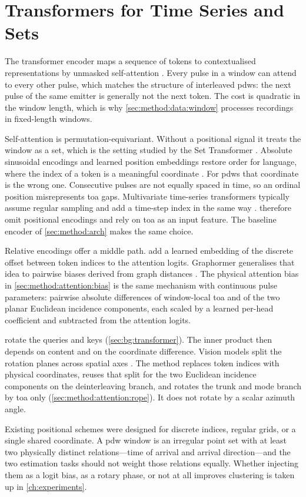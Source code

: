 \section{Transformers for Time Series and Sets}\label{sec:related:transformers_seq}

The transformer encoder maps a sequence of tokens to contextualised representations by unmasked self-attention \parencite{vaswani2017attention,devlin2019bert}.
Every pulse in a window can attend to every other pulse, which matches the structure of interleaved \glspl{pdw}: the next pulse of the same emitter is generally not the next token.
The cost is quadratic in the window length, which is why \cref{sec:method:data:window} processes recordings in fixed-length windows.

Self-attention is permutation-equivariant.
Without a positional signal it treats the window as a set, which is the setting studied by the Set Transformer \parencite{lee2019set}.
Absolute sinusoidal encodings and learned position embeddings restore order for language, where the index of a token is a meaningful coordinate \parencite{vaswani2017attention}.
For \glspl{pdw} that coordinate is the wrong one.
Consecutive pulses are not equally spaced in time, so an ordinal position misrepresents \gls{toa} gaps.
Multivariate time-series transformers typically assume regular sampling and add a time-step index in the same way \parencite{zerveas2021timeseries}.
\textcite{gunn2025deinterleaving} therefore omit positional encodings and rely on \gls{toa} as an input feature.
The baseline encoder of \cref{sec:method:arch} makes the same choice.

Relative encodings offer a middle path.
\textcite{shaw2018relative} add a learned embedding of the discrete offset between token indices to the attention logits.
Graphormer generalises that idea to pairwise biases derived from graph distances \parencite{ying2021graphormer}.
The physical attention bias in \cref{sec:method:attention:bias} is the same mechanism with continuous pulse parameters: pairwise absolute differences of window-local \gls{toa} and of the two planar Euclidean incidence components, each scaled by a learned per-head coefficient and subtracted from the attention logits.

\textcite{su2024roformer} rotate the queries and keys (\cref{sec:bg:transformer}).
The inner product then depends on content and on the coordinate difference.
Vision models split the rotation planes across spatial axes \parencite{heo2024ropevit}.
The method replaces token indices with physical coordinates, reuses that split for the two Euclidean incidence components on the deinterleaving branch, and rotates the trunk and mode branch by \gls{toa} only (\cref{sec:method:attention:rope}).
It does not rotate by a scalar azimuth angle.

Existing positional schemes were designed for discrete indices, regular grids, or a single shared coordinate.
A \gls{pdw} window is an irregular point set with at least two physically distinct relations---time of arrival and arrival direction---and the two estimation tasks should not weight those relations equally.
Whether injecting them as a logit bias, as a rotary phase, or not at all improves clustering is taken up in \cref{ch:experiments}.
